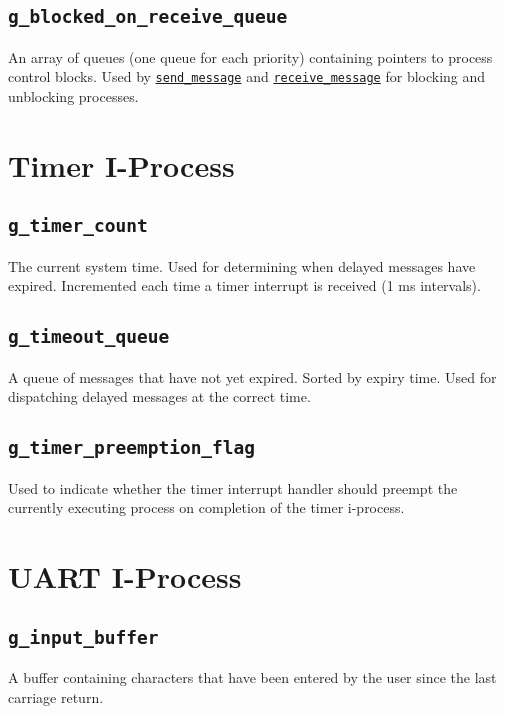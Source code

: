 \documentclass[12pt]{report}
\begin{document}
\subsection{\texttt{g_blocked_on_receive_queue}}

An array of queues (one queue for each priority) containing pointers to process control blocks. Used by \hyperref[alg:sendingmessages]{\texttt{send_message}} and \hyperref[alg:receivingmessages]{\texttt{receive_message}} for blocking and unblocking processes.

\section{Timer I-Process}

\subsection{\texttt{g_timer_count}}
\label{app:gtimercount}

The current system time. Used for determining when delayed messages have expired. Incremented each time a timer interrupt is received (1 ms intervals).

\subsection{\texttt{g_timeout_queue}}
\label{app:gtimeoutqueue}

A queue of messages that have not yet expired. Sorted by expiry time. Used for dispatching delayed messages at the correct time.

\subsection{\texttt{g_timer_preemption_flag}}

Used to indicate whether the timer interrupt handler should preempt the currently executing process on completion of the timer i-process.

\section{UART I-Process}
\label{app:uartglobals}

\subsection{\texttt{g_input_buffer}}

A buffer containing characters that have been entered by the user since the last carriage return.
\end{document}

